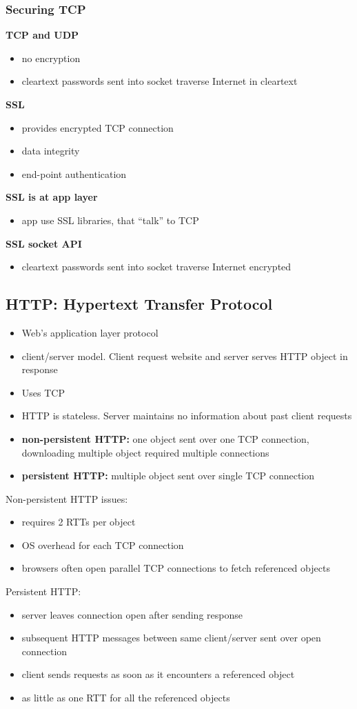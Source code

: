 \subsubsection{Securing TCP}
\textbf{TCP and UDP}
\begin{itemize}
	\item no encryption
	\item cleartext passwords sent into socket traverse Internet in cleartext
\end{itemize}
\textbf{SSL}
\begin{itemize}
	\item provides encrypted TCP connection
	\item data integrity
	\item end-point authentication
\end{itemize}
\textbf{SSL is at app layer}
\begin{itemize}
	\item app use SSL libraries, that ``talk'' to TCP
\end{itemize}
\textbf{SSL socket API}
\begin{itemize}
	\item cleartext passwords sent into socket traverse Internet encrypted
\end{itemize}

\subsection{HTTP: Hypertext Transfer Protocol}
\begin{itemize}
	\item Web's application layer protocol
	\item client/server model. Client request website and server serves HTTP object in response
	\item Uses TCP
	\item HTTP is stateless. Server maintains no information about past client requests
	\item \textbf{non-persistent HTTP:} one object sent over one TCP connection, downloading multiple object required multiple connections
	\item \textbf{persistent HTTP:} multiple object sent over single TCP connection
\end{itemize}
Non-persistent HTTP issues:
\begin{itemize}
	\item requires 2 RTTs per object
	\item OS overhead for each TCP connection
	\item browsers often open parallel TCP connections to fetch referenced objects
\end{itemize}
Persistent HTTP:
\begin{itemize}
	\item server leaves connection open after sending response
	\item subsequent HTTP messages between same client/server sent over open connection
	\item client sends requests as soon as it encounters a referenced object
	\item as little as one RTT for all the referenced objects
\end{itemize}
